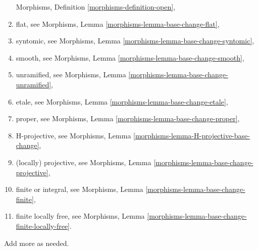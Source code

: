 \begin{remark}
\begin{enumerate}
Morphisms, Definition \ref{morphisms-definition-open},
\item flat, see
Morphisms, Lemma \ref{morphisms-lemma-base-change-flat},
\item syntomic, see
Morphisms, Lemma \ref{morphisms-lemma-base-change-syntomic},
\item smooth, see
Morphisms, Lemma \ref{morphisms-lemma-base-change-smooth},
\item unramified, see
Morphisms, Lemma \ref{morphisms-lemma-base-change-unramified},
\item etale, see
Morphisms, Lemma \ref{morphisms-lemma-base-change-etale},
\item proper, see
Morphisms, Lemma \ref{morphisms-lemma-base-change-proper},
\item H-projective, see
Morphisms, Lemma \ref{morphisms-lemma-H-projective-base-change},
\item (locally) projective, see
Morphisms, Lemma \ref{morphisms-lemma-base-change-projective},
\item finite or integral, see
Morphisms, Lemma \ref{morphisms-lemma-base-change-finite},
\item finite locally free, see
Morphisms, Lemma \ref{morphisms-lemma-base-change-finite-locally-free}.
\end{enumerate}
Add more as needed.
\end{remark}

